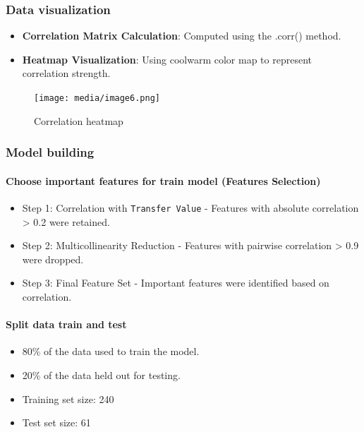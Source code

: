 \documentclass[12pt,a4paper]{report}
\begin{document}
\subsubsection{Data visualization}
\begin{itemize}
    \item \textbf{Correlation Matrix Calculation}: Computed using the .corr() method.
    \item \textbf{Heatmap Visualization}: Using coolwarm color map to represent correlation strength.
\end{itemize}

\begin{figure}[H]
    \centering
    \texttt{[image: media/image6.png]}
    \caption{Correlation heatmap}
\end{figure}

\subsubsection{Model building}
\paragraph{Choose important features for train model (Features Selection)}
\begin{itemize}
    \item Step 1: Correlation with \texttt{Transfer Value} - Features with absolute correlation > 0.2 were retained.
    \item Step 2: Multicollinearity Reduction - Features with pairwise correlation > 0.9 were dropped.
    \item Step 3: Final Feature Set - Important features were identified based on correlation.
\end{itemize}

\paragraph{Split data train and test}
\begin{itemize}
    \item 80\% of the data used to train the model.
    \item 20\% of the data held out for testing.
    \item Training set size: 240
    \item Test set size: 61
\end{itemize}
\end{document}
